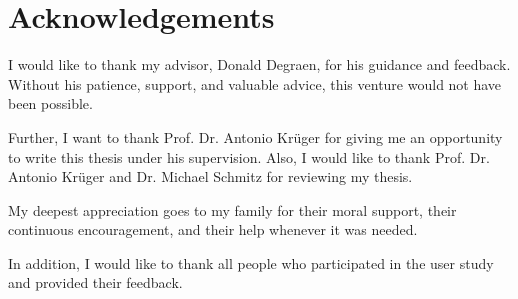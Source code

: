 ﻿\section*{Acknowledgements}
I would like to thank my advisor, Donald Degraen, for his guidance and feedback.
Without his patience, support, and valuable advice, this venture would not have been possible.

Further, I want to thank Prof. Dr. Antonio Krüger for giving me an opportunity to write this
thesis under his supervision.
Also, I would like to thank Prof. Dr. Antonio Krüger and Dr. Michael Schmitz for reviewing my thesis.

My deepest appreciation goes to my family for their moral support, their continuous encouragement,
and their help whenever it was needed.

In addition, I would like to thank all people who participated in the user study and
provided their feedback.

